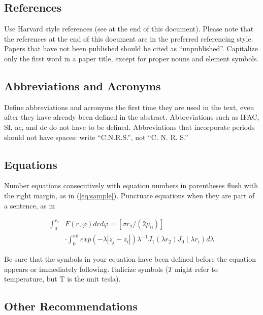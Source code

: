 \documentclass{ifacconf}
\begin{document}
\subsection{References}

Use Harvard style references (see at the end of this document). Please note that the references at the end of this
document are in the preferred referencing style. Papers that have not
been published should be cited as ``unpublished''.  Capitalize only the
first word in a paper title, except for proper nouns and element
symbols.

\subsection{Abbreviations and Acronyms}

Define abbreviations and acronyms the first time they are used in the
text, even after they have already been defined in the
abstract. Abbreviations such as IFAC, SI, ac, and dc do not have to be
defined. Abbreviations that incorporate periods should not have
spaces: write ``C.N.R.S.'', not ``C. N. R. S.''

\subsection{Equations}

Number equations consecutively with equation numbers in parentheses
flush with the right margin, as in (\ref{eq:sample}). Punctuate equations when they are part of a sentence, as
in

\begin{equation} \label{eq:sample2}
\begin{array}{ll}
\int_0^{r_2} & F (r, \varphi ) dr d\varphi = [\sigma r_2 / (2 \mu_0 )] \\
& \cdot \int_0^{\inf} exp(-\lambda |z_j - z_i |) \lambda^{-1} J_1 (\lambda  r_2 ) J_0 (\lambda r_i ) d\lambda 
\end{array}
\end{equation}

Be sure that the symbols in your equation have been defined before the
equation appears or immediately following. Italicize symbols ($T$
might refer to temperature, but T is the unit tesla).

\subsection{Other Recommendations}
\end{document}

